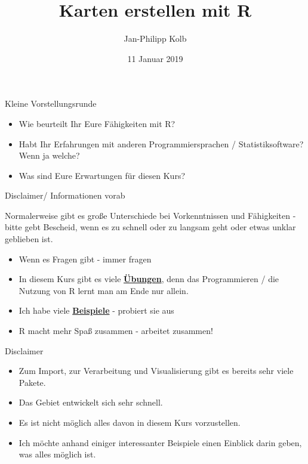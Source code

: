 \documentclass[ignorenonframetext,]{beamer}
\title{Karten erstellen mit R}
\author{Jan-Philipp Kolb}
\date{11 Januar 2019}
\providecommand{\tightlist}{%
  \setlength{\itemsep}{0pt}\setlength{\parskip}{0pt}}
\begin{document}
\frame{\titlepage}

\begin{frame}{Kleine Vorstellungsrunde}

\begin{itemize}
\tightlist
\item
  Wie beurteilt Ihr Eure Fähigkeiten mit R?
\item
  Habt Ihr Erfahrungen mit anderen Programmiersprachen /
  Statistiksoftware? Wenn ja welche?
\item
  Was sind Eure Erwartungen für diesen Kurs?
\end{itemize}

\end{frame}

\begin{frame}{Disclaimer/ Informationen vorab}

Normalerweise gibt es große Unterschiede bei Vorkenntnissen und
Fähigkeiten - bitte gebt Bescheid, wenn es zu schnell oder zu langsam
geht oder etwas unklar geblieben ist.

\begin{itemize}
\tightlist
\item
  Wenn es Fragen gibt - immer fragen
\item
  In diesem Kurs gibt es viele
  \href{http://web.math.ku.dk/~helle/R-intro/exercises.pdf}{\textbf{Übungen}},
  denn das Programmieren / die Nutzung von R lernt man am Ende nur
  allein.
\item
  Ich habe viele \href{https://www.showmeshiny.com/}{\textbf{Beispiele}}
  - probiert sie aus
\item
  R macht mehr Spaß zusammen - arbeitet zusammen!
\end{itemize}

\end{frame}

\begin{frame}{Disclaimer}

\begin{itemize}
\tightlist
\item
  Zum Import, zur Verarbeitung und Visualisierung gibt es bereits sehr
  viele Pakete.
\item
  Das Gebiet entwickelt sich sehr schnell.
\item
  Es ist nicht möglich alles davon in diesem Kurs vorzustellen.
\item
  Ich möchte anhand einiger interessanter Beispiele einen Einblick darin
  geben, was alles möglich ist.
\end{itemize}

\end{frame}
\end{document}
